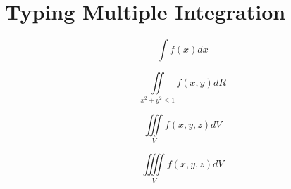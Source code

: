 \documentclass{article}
\begin{document}
	
\section{Typing Multiple Integration}

\begin{equation}
	\int f(x) dx
\end{equation}


\begin{equation}
	\iint\limits_{x^2+y^2\leq 1} f(x,y) dR
\end{equation}

\begin{equation}
	\iiint\limits_V f(x,y,z) dV
\end{equation}

\begin{equation}
	\iiiint\limits_V f(x,y,z) dV
\end{equation}
\end{document}
